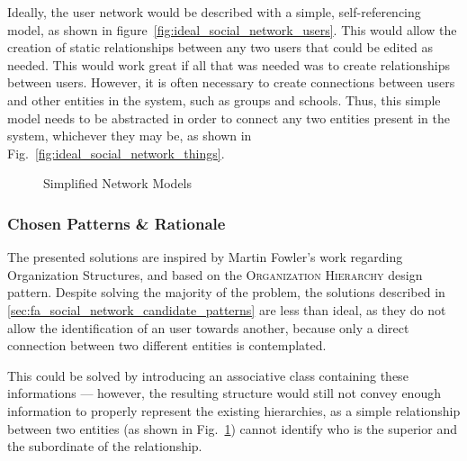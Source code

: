 Ideally, the user network would be described with a simple, self-referencing model, as shown in figure~\ref{fig:ideal_social_network_users}. This would allow the creation of static relationships between any two users that could be edited as needed. This would work great if all that was needed was to create relationships between users. However, it is often necessary to create connections between users and other entities in the system, such as groups and schools. Thus, this simple model needs to be abstracted in order to connect any two entities present in the system, whichever they may be, as shown in Fig.~\ref{fig:ideal_social_network_things}.

\begin{figure}[H]
  \centering
  \hspace{20mm}
  \caption{Simplified Network Models}
  \label{fig:simplified_network_models}
\end{figure}

\subsubsection{Chosen Patterns \& Rationale}\label{sec:fa_social_network_chosen_patterns_rationale}

The presented solutions are inspired by Martin Fowler's work regarding Organization Structures, and based on the \textsc{Organization Hierarchy} design pattern. Despite solving the majority of the problem, the solutions described in \ref{sec:fa_social_network_candidate_patterns} are less than ideal, as they do not allow the identification of an user towards another, because only a direct connection between two different entities is contemplated.

This could be solved by introducing an associative class containing these informations --- however, the resulting structure would still not convey enough information to properly represent the existing hierarchies, as a simple relationship between two entities (as shown in Fig.~\ref{fig:simplified_network_models}) cannot identify who is the superior and the subordinate of the relationship.

